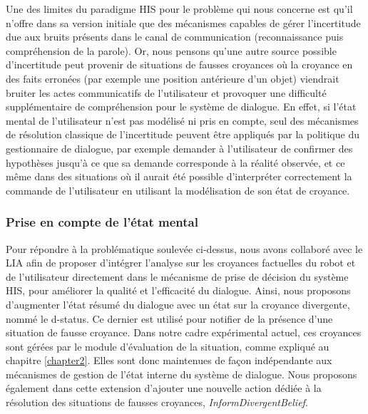 \documentclass[a4paper,11pt,twoside]{StyleThese}
\begin{document}
Une des limites du paradigme HIS pour le problème qui nous concerne est qu’il
n’offre dans sa version initiale que des mécanismes capables de gérer l’incertitude due aux bruits présents dans le canal de communication (reconnaissance puis compréhension
de la parole). 
Or, nous pensons qu’une autre source possible d'incertitude peut
provenir de situations de fausses croyances où la croyance en des faits erronées (par exemple une position antérieure d’un objet) viendrait bruiter les actes  communicatifs
de l’utilisateur et provoquer une difficulté supplémentaire de compréhension pour le système de dialogue. En effet, si l’état mental de l’utilisateur n’est pas modélisé ni pris en compte, seul des mécanismes de résolution classique de l’incertitude peuvent être appliqués par la politique du gestionnaire de dialogue, par exemple demander à l’utilisateur de confirmer des hypothèses
jusqu’à ce que sa demande corresponde à la réalité observée, et ce même dans
des situations où il aurait été possible d'interpréter correctement la commande de l'utilisateur en utilisant la modélisation de son état de croyance.




\subsubsection{Prise en compte de l'état mental}
\label{sec:mentalStateDial}
Pour répondre à la problématique soulevée ci-dessus, nous avons collaboré avec le LIA afin de  proposer d'intégrer l’analyse sur les
croyances factuelles du robot et de l’utilisateur directement dans le mécanisme de prise
de décision du système HIS, pour améliorer la qualité et l’efficacité du dialogue. Ainsi, nous proposons d’augmenter l’état résumé du dialogue avec un état sur la croyance divergente, nommé le
d-status. Ce dernier est utilisé pour notifier de la présence d’une situation de fausse croyance.
Dans notre cadre expérimental actuel, ces croyances sont gérées par le module d'évaluation de la situation, comme expliqué au chapitre \ref{chapter2}. Elles sont donc maintenues de façon indépendante aux mécanismes de gestion de l’état interne du système de dialogue. Nous proposons également dans cette extension d’ajouter une nouvelle action dédiée à la résolution des situations de fausses croyances, \textit{InformDivergentBelief}.
\end{document}
